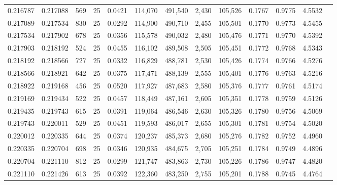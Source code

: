\begin{tabular}{rrrrrrrrrrrrr}
0.216787 & 0.217088 &   569 &  25 &                                     0.0421 & 114,070 & 491,540 &   2,430 & 105,526 & 0.1767 & 0.9775 & 4.5532 \\
0.217089 & 0.217534 &   830 &  25 &                                     0.0292 & 114,900 & 490,710 &   2,455 & 105,501 & 0.1770 & 0.9773 & 4.5455 \\
0.217534 & 0.217902 &   678 &  25 &                                     0.0356 & 115,578 & 490,032 &   2,480 & 105,476 & 0.1771 & 0.9770 & 4.5392 \\
0.217903 & 0.218192 &   524 &  25 &                                     0.0455 & 116,102 & 489,508 &   2,505 & 105,451 & 0.1772 & 0.9768 & 4.5343 \\
0.218192 & 0.218566 &   727 &  25 &                                     0.0332 & 116,829 & 488,781 &   2,530 & 105,426 & 0.1774 & 0.9766 & 4.5276 \\
0.218566 & 0.218921 &   642 &  25 &                                     0.0375 & 117,471 & 488,139 &   2,555 & 105,401 & 0.1776 & 0.9763 & 4.5216 \\
0.218922 & 0.219168 &   456 &  25 &                                     0.0520 & 117,927 & 487,683 &   2,580 & 105,376 & 0.1777 & 0.9761 & 4.5174 \\
0.219169 & 0.219434 &   522 &  25 &                                     0.0457 & 118,449 & 487,161 &   2,605 & 105,351 & 0.1778 & 0.9759 & 4.5126 \\
0.219435 & 0.219743 &   615 &  25 &                                     0.0391 & 119,064 & 486,546 &   2,630 & 105,326 & 0.1780 & 0.9756 & 4.5069 \\
0.219743 & 0.220011 &   529 &  25 &                                     0.0451 & 119,593 & 486,017 &   2,655 & 105,301 & 0.1781 & 0.9754 & 4.5020 \\
0.220012 & 0.220335 &   644 &  25 &                                     0.0374 & 120,237 & 485,373 &   2,680 & 105,276 & 0.1782 & 0.9752 & 4.4960 \\
0.220335 & 0.220704 &   698 &  25 &                                     0.0346 & 120,935 & 484,675 &   2,705 & 105,251 & 0.1784 & 0.9749 & 4.4896 \\
0.220704 & 0.221110 &   812 &  25 &                                     0.0299 & 121,747 & 483,863 &   2,730 & 105,226 & 0.1786 & 0.9747 & 4.4820 \\
0.221110 & 0.221426 &   613 &  25 &                                     0.0392 & 122,360 & 483,250 &   2,755 & 105,201 & 0.1788 & 0.9745 & 4.4764 \\

\end{tabular}
